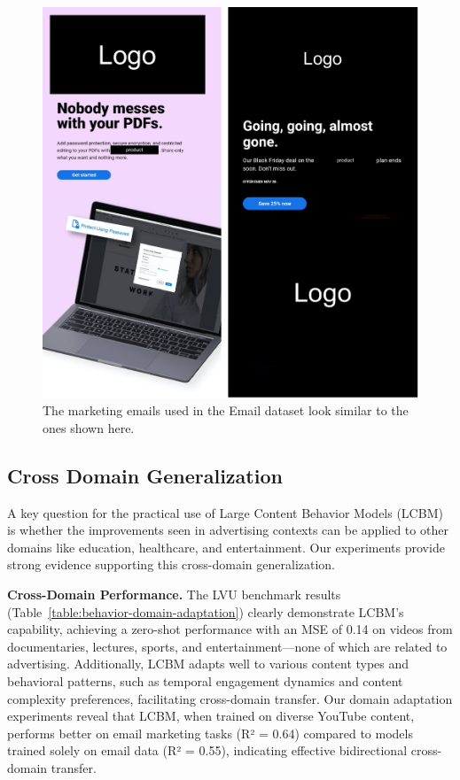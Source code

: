 \begin{figure}[!htbp]
    \centering
    \includegraphics[width=\textwidth]{images/email-ex-logo-redacted.pdf}
    \caption{The \companyName marketing emails used in the Email dataset look similar to the ones shown here.}
    \label{fig:figure-email-example-expanded}
\end{figure}




\subsection{Cross Domain Generalization}
\label{sec:cross-domain-generalization}

A key question for the practical use of Large Content Behavior Models (LCBM) is whether the improvements seen in advertising contexts can be applied to other domains like education, healthcare, and entertainment. Our experiments provide strong evidence supporting this cross-domain generalization.

\textbf{Cross-Domain Performance.} The LVU benchmark results (Table~\ref{table:behavior-domain-adaptation}) clearly demonstrate LCBM's capability, achieving a zero-shot performance with an MSE of 0.14 on videos from documentaries, lectures, sports, and entertainment—none of which are related to advertising. Additionally, LCBM adapts well to various content types and behavioral patterns, such as temporal engagement dynamics and content complexity preferences, facilitating cross-domain transfer. Our domain adaptation experiments reveal that LCBM, when trained on diverse YouTube content, performs better on email marketing tasks (R² = 0.64) compared to models trained solely on email data (R² = 0.55), indicating effective bidirectional cross-domain transfer.

